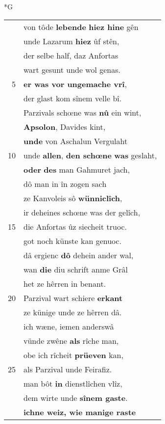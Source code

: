 \documentclass[8pt,a4paper,notitlepage]{article}
\begin{document}
\begin{table}[ht]
\begin{minipage}[t]{0.5\linewidth}
\small
\begin{center}*G
\end{center}
\begin{tabular}{rl}
 & von tôde \textbf{lebende} \textbf{hiez hine} gên\\ 
 & unde Lazarum \textbf{hiez} ûf stên,\\ 
 & der selbe half, daz Anfortas\\ 
 & wart gesunt unde wol genas.\\ 
5 & \textbf{er was vor ungemache vrî},\\ 
 & der glast kom sînem velle bî.\\ 
 & Parzivals schœne was \textbf{nû} ein wint,\\ 
 & \textbf{Apsolon}, Davides kint,\\ 
 & \textbf{unde} von Aschalun Vergulaht\\ 
10 & unde \textbf{allen}, \textbf{den schœne} \textbf{was} geslaht,\\ 
 & \textbf{oder} \textbf{des} man Gahmuret jach,\\ 
 & dô man in în zogen sach\\ 
 & ze Kanvoleis sô \textbf{wünniclîch},\\ 
 & ir deheines schœne was der gelîch,\\ 
15 & die Anfortas ûz siecheit truoc.\\ 
 & got noch künste kan genuoc.\\ 
 & dâ ergienc \textbf{dô} dehein ander wal,\\ 
 & wan \textbf{die} diu schrift anme Grâl\\ 
 & het ze hêrren in benant.\\ 
20 & Parzival wart schiere \textbf{erkant}\\ 
 & ze künige unde ze hêrren dâ.\\ 
 & ich wæne, iemen anderswâ\\ 
 & vünde zwêne \textbf{als} rîche man,\\ 
 & obe ich rîcheit \textbf{prüeven} kan,\\ 
25 & als Parzival unde Feirafiz.\\ 
 & man bôt \textbf{in} dienstlîchen vlîz,\\ 
 & dem wirte unde \textbf{sînem gaste}.\\ 
 & \textbf{ichne weiz, wie manige raste}\\ 

\end{tabular}
\end{minipage}
\end{table}
\end{document}
